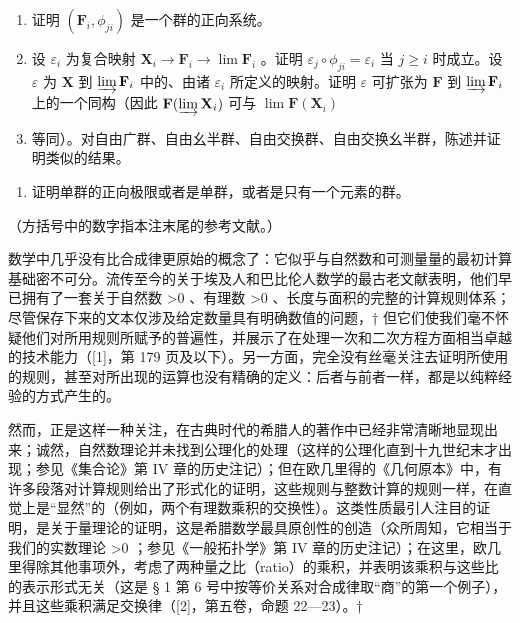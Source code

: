 \begin{enumerate}
\def\labelenumi{(\alph{enumi})}
\item
  证明 \((\mathbf{F}_i,\phi_{ji})\) 是一个群的正向系统。
\item
  设 \(\varepsilon_{i}\) 为复合映射 \(\mathbf{X}_{i} \to \mathbf{F}_{i} \to \lim \mathbf{F}_{i}\) 。证明 \(\varepsilon_{j} \circ \phi_{ji} = \varepsilon_{i}\) 当 \(j \geqslant i\) 时成立。设 \(\varepsilon\) 为 \(\mathbf{X}\) 到 \(\varinjlim \mathbf{F}_{i}\) 中的、由诸 \(\varepsilon_{i}\) 所定义的映射。证明 \(\varepsilon\) 可扩张为 \(\mathbf{F}\) 到 \(\varinjlim \mathbf{F}_{i}\) 上的一个同构（因此 \(\mathbf{F}(\varinjlim \mathbf{X}_{i})\) 可与 \(\lim \mathbf{F}(\mathbf{X}_{i})\)
\item
  等同）。对自由广群、自由幺半群、自由交换群、自由交换幺半群，陈述并证明类似的结果。
\end{enumerate}

\begin{enumerate}
\def\labelenumi{\arabic{enumi}.}
\setcounter{enumi}{1}
\tightlist
\item
  证明单群的正向极限或者是单群，或者是只有一个元素的群。
\end{enumerate}


（方括号中的数字指本注末尾的参考文献。）

数学中几乎没有比合成律更原始的概念了：它似乎与自然数和可测量量的最初计算基础密不可分。流传至今的关于埃及人和巴比伦人数学的最古老文献表明，他们早已拥有了一套关于自然数 \textgreater0 、有理数 \textgreater0 、长度与面积的完整的计算规则体系；尽管保存下来的文本仅涉及给定数量具有明确数值的问题，† 但它们使我们毫不怀疑他们对所用规则所赋予的普遍性，并展示了在处理一次和二次方程方面相当卓越的技术能力（{[}1{]}，第 179 页及以下）。另一方面，完全没有丝毫关注去证明所使用的规则，甚至对所出现的运算也没有精确的定义：后者与前者一样，都是以纯粹经验的方式产生的。

然而，正是这样一种关注，在古典时代的希腊人的著作中已经非常清晰地显现出来；诚然，自然数理论并未找到公理化的处理（这样的公理化直到十九世纪末才出现；参见《集合论》第 IV 章的历史注记）；但在欧几里得的《几何原本》中，有许多段落对计算规则给出了形式化的证明，这些规则与整数计算的规则一样，在直觉上是“显然”的（例如，两个有理数乘积的交换性）。这类性质最引人注目的证明，是关于量理论的证明，这是希腊数学最具原创性的创造（众所周知，它相当于我们的实数理论 \textgreater0 ；参见《一般拓扑学》第 IV 章的历史注记）；在这里，欧几里得除其他事项外，考虑了两种量之比（ratio）的乘积，并表明该乘积与这些比的表示形式无关（这是 § 1 第 6 号中按等价关系对合成律取“商”的第一个例子），并且这些乘积满足交换律（{[}2{]}，第五卷，命题 22—23）。†

